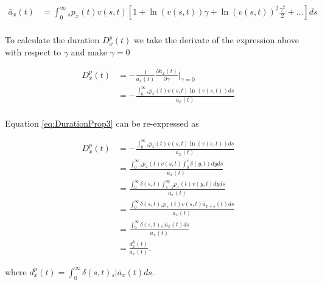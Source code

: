 \documentclass[12pt]{article}
\begin{document}
{\begin{equation}\label{eq:DurationProp2}
\begin{split}
\bar{a}_x(t) &= \int_0^\infty {}_sp_x(t) v(s,t)[1+\ln(v(s,t)) \gamma+{\ln(v(s,t))}^2 \frac{\gamma^2}{2}+...]ds\\
\end{split}
\end{equation}


To calculate the duration ${D}^{p}_{x}(t)$ we take the derivate of the expression above with respect to $\gamma$ and make $\gamma=0$

\begin{equation}\label{eq:DurationProp3}
\begin{split}
{D}^{p}_{x}(t)&=-\frac{1}{\bar{a}_x(t)}\frac{\partial \bar{a}_x(t)}{\partial \gamma} \bigg\rvert_{\gamma=0} \\
&= -\frac{\int_0^\infty {}_sp_x(t) v(s,t) \ln(v(s,t))ds}{\bar{a}_x(t)} \\
\end{split}
\end{equation}


Equation \ref{eq:DurationProp3} can be re-expressed as 


\begin{equation}\label{eq:DurationProp4}
\begin{split}
{D}^{p}_{x}(t) &= -\frac{\int_0^\infty {}_sp_x(t) v(s,t) \ln(v(s,t))ds}{\bar{a}_x(t)}\\
&= \frac{\int_0^\infty {}_sp_x(t) v(s,t) \int_0^{s} \delta(y,t)dy ds }{\bar{a}_x(t)}\\
&= \frac{\int_0^\infty \delta(s,t)  \int_{s}^{\infty} {}_{y}p_x(t) v(y,t)dy ds }{\bar{a}_x(t)}\\
&= \frac{\int_0^\infty \delta(s,t) {}_sp_x(t) v(s,t) \bar{a}_{x+s}(t)  ds }{\bar{a}_x(t)}\\
&= \frac{\int_0^\infty \delta(s,t) {}_s|\bar{a}_x(t) ds}{\bar{a}_x(t)} \\
&= \frac{{d}^{p}_{x}(t)}{\bar{a}_x(t)}.
\end{split}
\end{equation}



where ${d}^{p}_{x}(t)=\int_0^\infty \delta(s,t) {}_s|\bar{a}_x(t) ds$.

\setcounter{figure}{0}
}
\end{document}
